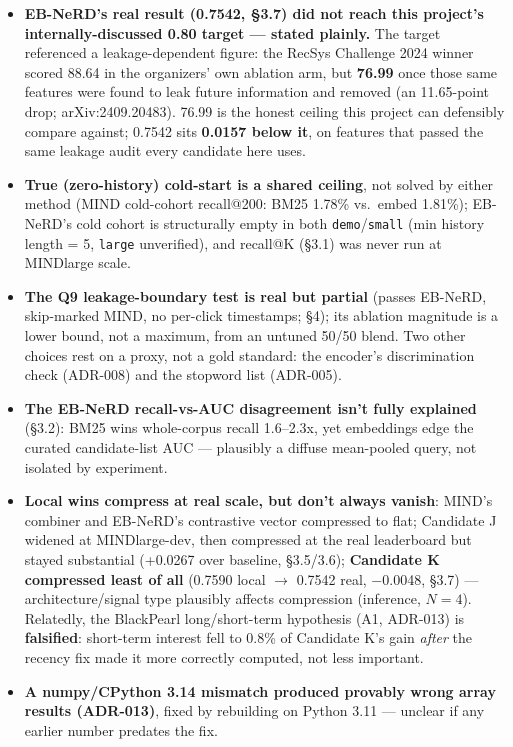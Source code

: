 \documentclass[10.5pt]{article}
\begin{document}
\begin{sloppypar}
\begin{itemize}
\item \textbf{EB-NeRD's real result (0.7542, \S3.7) did not reach this
  project's internally-discussed 0.80 target --- stated plainly.} The
  target referenced a leakage-dependent figure: the RecSys Challenge 2024
  winner scored 88.64 in the organizers' own ablation arm, but
  \textbf{76.99} once those same features were found to leak future
  information and removed (an 11.65-point drop; arXiv:2409.20483). 76.99
  is the honest ceiling this project can defensibly compare against;
  0.7542 sits \textbf{0.0157 below it}, on
  features that passed the same leakage audit every candidate here uses.
\item \textbf{True (zero-history) cold-start is a shared ceiling}, not
  solved by either method (MIND cold-cohort recall@200: BM25 1.78\% vs.\
  embed 1.81\%); EB-NeRD's cold cohort is structurally empty in both
  \texttt{demo}/\texttt{small} (min history length = 5, \texttt{large}
  unverified), and recall@K (\S3.1) was never run at MINDlarge scale.
\item \textbf{The Q9 leakage-boundary test is real but partial} (passes
  EB-NeRD, skip-marked MIND, no per-click timestamps; \S4); its ablation
  magnitude is a lower bound, not a maximum, from an untuned 50/50 blend.
  Two other choices rest on a proxy, not a gold standard: the encoder's
  discrimination check (ADR-008) and the stopword list (ADR-005).
\item \textbf{The EB-NeRD recall-vs-AUC disagreement isn't fully
  explained} (\S3.2): BM25 wins whole-corpus recall 1.6--2.3x, yet
  embeddings edge the curated candidate-list AUC --- plausibly a diffuse
  mean-pooled query, not isolated by experiment.
\item \textbf{Local wins compress at real scale, but don't always
  vanish}: MIND's combiner and EB-NeRD's contrastive vector compressed to
  flat; Candidate J widened at MINDlarge-dev, then compressed at the real
  leaderboard but stayed substantial (+0.0267 over baseline, \S3.5/3.6);
  \textbf{Candidate K compressed least of all} (0.7590 local $\to$ 0.7542
  real, $-$0.0048, \S3.7) --- architecture/signal type plausibly affects
  compression (inference, $N=4$). Relatedly, the BlackPearl long/short-term
  hypothesis (A1, ADR-013) is \textbf{falsified}: short-term interest fell
  to 0.8\% of Candidate K's gain \emph{after} the recency fix made it more
  correctly computed, not less important.
\item \textbf{A numpy/CPython 3.14 mismatch produced provably wrong array
  results (ADR-013)}, fixed by rebuilding on Python 3.11 --- unclear if
  any earlier number predates the fix.
\end{itemize}
\end{sloppypar}
\end{document}
